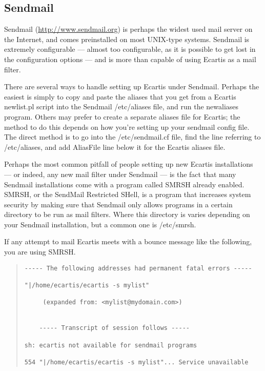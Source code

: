 \documentclass{book}
\begin{document}
\subsection{Sendmail}
\label{starting:filters:sendmail}
   
Sendmail (\href{http://www.sendmail.org}{http://www.sendmail.org}) is perhaps the widest used mail
server on the Internet, and comes preinstalled on most UNIX-type systems.
Sendmail is extremely configurable --- almost too configurable, as it is
possible to get lost in the configuration options --- and is more than capable
of using Ecartis as a mail filter.
   
There are several ways to handle setting up Ecartis under Sendmail.  Perhaps
the easiest is simply to copy and paste the aliases that you get from a Ecartis
newlist.pl script into the Sendmail /etc/aliases file, and run the newaliases
program.  Others may prefer to create a separate aliases file for Ecartis; the
method to do this depends on how you're setting up your sendmail config file.
The direct method is to go into the /etc/sendmail.cf file, find the line
referring to /etc/aliases, and add AliasFile line below it for the Ecartis
aliases file.

Perhaps the most common pitfall of people setting up new Ecartis installations
--- or indeed, any new mail filter under Sendmail --- is the fact that many
Sendmail installations come with a program called SMRSH already enabled.
SMRSH, or the SendMail Restricted SHell, is a program that increases system
security by making sure that Sendmail only allows programs in a certain
directory to be run as mail filters.  Where this directory is varies depending
on your Sendmail installation, but a common one is /etc/smrsh.
   
If any attempt to mail Ecartis meets with a bounce message like the following,
you are using SMRSH.
   
\begin{quote}   
\footnotesize
\begin{verbatim}
----- The following addresses had permanent fatal errors -----

"|/home/ecartis/ecartis -s mylist"

     (expanded from: <mylist@mydomain.com>)


    ----- Transcript of session follows -----

sh: ecartis not available for sendmail programs

554 "|/home/ecartis/ecartis -s mylist"... Service unavailable
\end{verbatim}
\end{quote}
   
\end{document}
